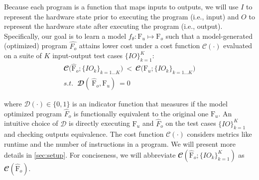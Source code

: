 \documentclass{article}
\newcommand\p{\ensuremath{{\mathrm{F}_u}}}
\begin{document}
Because each program is a function that maps inputs to outputs, we will use $I$ to represent the hardware state prior to executing the program (i.e., input) and $O$ to represent the hardware state after executing the program (i.e., output).
Specifically, our goal is to learn a model $f_{\theta}: \text{F}_u \mapsto \text{F}_o$ such that a model-generated (optimized) program $\hat{F_o}$ attains lower cost under a cost function $\mathcal{C}(\cdot)$ evaluated on a suite of $K$ input-output test cases $\{ IO \}_{k=1}^K$:
\begin{equation}
    \label{eqn:optimizaiton_goal}
    \begin{split}
        \mathbfcal{C} \Big(\hat{\textrm{F}}_{o}; \{IO_k\}_{k=1...K} \Big)  \ 
        < \ 
        \mathbfcal{C} \Big(\textrm{F}_{u}; \{IO_k\}_{k=1...K}\Big) \\
         s.t. \;\; \mathbfcal{D}( \ 
                        \hat{\textrm{F}}_{o}, \textrm{F}_{u} ) \ 
                        = 0  %
    \end{split}
\end{equation}

where $\mathcal{D}(\cdot) \in \{ 0, 1 \}$ is an indicator function that measures if the model optimized program $\hat{F}_o$ is functionally equivalent to the original one $\p$. 
An intuitive choice of $\mathcal{D}$ is directly executing $\p$ and $\hat{F}_o$ on the test cases $\{ IO \}_{k=1}^K$ and checking outputs equivalence. The cost function $\mathcal{C}(\cdot)$ considers metrics like runtime and the number of instructions in a program.
We will present more details in \cref{sec:setup}.
For conciseness, we will abbreviate $\mathbfcal{C} (\hat{\textrm{F}}_{o}; \{IO_k\}_{k=1}^K)$ as $\mathbfcal{C} (\hat{\textrm{F}}_{o})$. 
\end{document}
